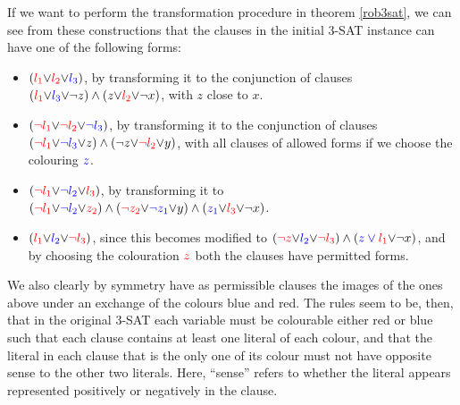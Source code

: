 \documentclass[reprint]{revtex4-1}
\theoremstyle{definition}
\begin{document}
If we want to perform the transformation procedure in theorem \ref{rob3sat}, we can see from these constructions that the clauses in the initial \textsc{3-SAT} instance can have one of the following forms:

\begin{itemize}
\item $(\color{red}{ l_1} \color{black}{\vee} \color{red}{l_2} \color{black}{\vee} \color{blue}{l_3}\color{black} )$, by transforming it to the conjunction of clauses $(\color{red}{l_1}  \color{black}{\vee} \color{blue}{l_3}\color{black}{\vee} \color{black}{\neg z})\wedge(\color{black}{z}\color{black}{\vee} \color{red}{l_2}\color{black}{\vee} \neg x)$, with $z$ close to $x$.

\item $(\color{red}{\neg l_1} \color{black}{\vee} \color{red}{\neg l_2} \color{black}{\vee} \color{blue}{\neg l_3}\color{black} )$, by transforming it to the conjunction of clauses $(\color{red}{\neg l_1}  \color{black}{\vee} \color{blue}{\neg l_3}\color{black}{\vee} \color{black}{z})\wedge(\color{black}{\neg z}\color{black}{\vee} \color{red}{\neg l_2}\color{black}{\vee} y)$, with all clauses of allowed forms if we choose the colouring $\color{blue}{z}$.

\item $(\color{red}{\neg l_1} \color{black}{\vee} \color{blue}{\neg l_2} \color{black}{\vee} \color{red}{l_3} \color{black})$, by transforming it to 
$(\color{red}{\neg l_1}  \color{black}{\vee}\color{blue}{\neg l_2}  \color{black}{\vee} \color{red}{z_2}   \color{black}) \wedge(\color{red}{\neg z_2}  \color{black}{\vee}  \color{blue}{\neg z_1} \color{black}{\vee}y)    \wedge    (\color{blue}{z_1} \color{black}{\vee}\color{red}{ l_3}  \color{black}{\vee} \neg x)$.

\item $(\color{red}{ l_1} \color{black}{\vee} \color{blue}{l_2} \color{black}{\vee} \color{red}{\neg l_3}\color{black} )$, since this becomes modified to 
$(\color{red}{\neg z} \color{black}{\vee} \color{blue}{ l_2} \color{black}{\vee} \color{red}{\neg l_3}\color{black})\wedge(\color{blue}{z} \vee \color{red}{ l_1}\color{black}{\vee} \neg x)$, and by choosing the colouration $\color{red}{z}$ both the clauses have permitted forms.
\end{itemize}
We also clearly by symmetry have as permissible clauses the images of the ones above under an exchange of the colours blue and red. The rules seem to be, then, that in the original \textsc{3-SAT} each variable must be colourable either red or blue such that each clause contains at least one literal of each colour, and that the literal in each clause that is the only one of its colour must not have opposite sense to the other two literals. Here, ``sense'' refers to whether the literal appears represented positively or negatively in the clause. 
\end{document}
